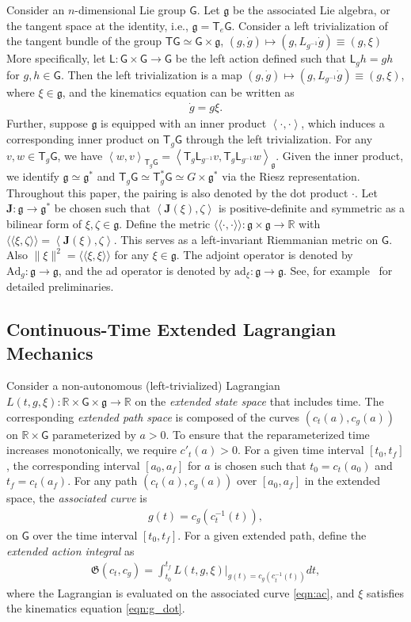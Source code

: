 \documentclass[letterpaper, 10pt, conference]{ieeeconf}
\newcommand{\G}{\ensuremath{\mathsf{G}}}
\newcommand{\T}{\ensuremath{\mathsf{T}}}
\renewcommand{\L}{\ensuremath{\mathsf{L}}}
\renewcommand{\Re}{\ensuremath{\mathbb{R}}}
\newcommand{\pair}[1]{\ensuremath{\left\langle #1 \right\rangle}}
\newcommand{\met}[1]{\ensuremath{\langle\!\langle #1 \rangle\!\rangle}}
\newcommand{\Ad}{\ensuremath{\mathrm{Ad}}}
\newcommand{\ad}{\ensuremath{\mathrm{ad}}}
\newcommand{\g}{\ensuremath{\mathfrak{g}}}
\begin{document}
Consider  an $n$-dimensional Lie group $\G$.
Let $\g$ be the associated Lie algebra, or the tangent space at the identity, i.e., $\g = \T_e\G$.
Consider a left trivialization of the tangent bundle of the group $\T\G \simeq \G\times \g$, $(g,\dot g)\mapsto (g, L_{g^{-1}}\dot g)\equiv(g,\xi)$
More specifically, let $\L:\G\times\G\rightarrow\G$ be the left action defined such that $\L_g h = gh$ for $g,h\in\G$.
Then the left trivialization is a map $(g,\dot g)\mapsto (g, L_{g^{-1}}\dot g)\equiv(g,\xi)$, where $\xi\in\g$, and the kinematics equation can be written as
\begin{align}
    \dot g = g\xi. \label{eqn:g_dot}
\end{align}
Further, suppose $\g$ is equipped with an inner product $\pair{\cdot, \cdot}$, which induces a corresponding inner product on $\T_g\G$ through the left trivialization.
For any $v,w\in\T_g\G$, we have $\pair{w,v}_{\T_g\G} = \pair{ \T_g \L_{g^{-1}} v, \T_g \L_{g^{-1}} w}_\g$. 
Given the inner product, we identify $\g\simeq \g^*$ and $\T_g \G \simeq \T^*_g \G\simeq G\times \g^*$ via the Riesz representation. Throughout this paper, the pairing is also denoted by the dot product $\cdot$.
Let $\mathbf{J}:\g\rightarrow\g^*$ be chosen such that $\pair{\mathbf{J}(\xi),\zeta}$ is positive-definite and symmetric as a bilinear form of $\xi,\zeta\in\g$.
Define the metric $\met{\cdot,\cdot}:\g\times\g\rightarrow\Re$ with $\met{\xi,\zeta} = \pair{\mathbf{J}(\xi),\zeta}$.
This serves as a left-invariant Riemmanian metric on $\G$.
Also $\|\xi\|^2 = \met{\xi,\xi}$ for any $\xi\in\g$.
The adjoint operator is denoted by $\Ad_g:\g\rightarrow\g$, and the ad operator is denoted by $\ad_\xi:\g\rightarrow\g$. See, for example~\cite{MarRat99} for detailed preliminaries. 

\subsection{Continuous-Time Extended Lagrangian Mechanics}

Consider a non-autonomous (left-trivialized) Lagrangian $L(t,g,\xi):\Re\times\G\times\g\rightarrow \Re$ on the \textit{extended state space} that includes  time.
The corresponding \textit{extended path space} is composed of the curves $(c_t(a),c_g(a))$ on $\Re\times \G$ parameterized by $a>0$.
To ensure that the reparameterized time increases monotonically, we require $c'_t(a) > 0$. 
For a given time interval $[t_0,t_f]$, the corresponding interval $[a_0,a_f]$ for $a$ is chosen such that $t_0=c_t(a_0)$ and $t_f=c_t(a_f)$.
For any path $(c_t(a),c_g(a))$ over $[a_0,a_f]$ in the extended space, the \textit{associated curve} is 
\begin{align}
    g(t) = c_g(c_t^{-1}(t)),\label{eqn:ac}
\end{align}
on $\G$ over the time interval $[t_0,t_f]$.
For a given extended path, define the \textit{extended action integral} as
\begin{align}
    \mathfrak{G}(c_t,c_g) = \int_{t_0}^{t_f} L(t,g,\xi)\bigg|_{g(t) = c_g(c_t^{-1}(t))} dt,\label{eqn:AI}
\end{align}
where the Lagrangian is evaluated on the associated curve \eqref{eqn:ac}, and $\xi$ satisfies the kinematics equation  \eqref{eqn:g_dot}.
\end{document}
